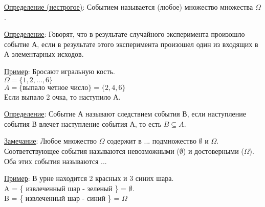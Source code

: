 \underline{Определение (нестрогое)}: Событием называется (любое) множество множества $\Omega$.

\underline{Определение}: Говорят, что в результате случайного эксперимента произошло событие А, если в результате этого эксперимента произошел один из входящих в А элементарных исходов.

\underline{Пример}: Бросают игральную кость. \\
$\Omega = \{ 1,2, ... ,6\}$ \\
$A = \{ \text{выпало четное число} \} = \{2,4,6\}$ \\
Если выпало 2 очка, то наступило А.

\underline{Определение}: Событие А называют следствием события В, если наступление события В влечет наступление события А, то есть $B \subseteq A$.


\underline{Замечание}: Любое множество $\Omega$ содержит в ... подмножество $\emptyset$ и $\Omega$. Соответствующее события называются невозможными ($\emptyset$) и достоверными ($\Omega$). Оба этих события называются ...

\underline{Пример}: В урне находится 2 красных и 3 синих шара. \\
A = \{ извлеченный шар - зеленый \} = $\emptyset$. \\
B = \{ извлеченный шар - синий \} = $\Omega$

























